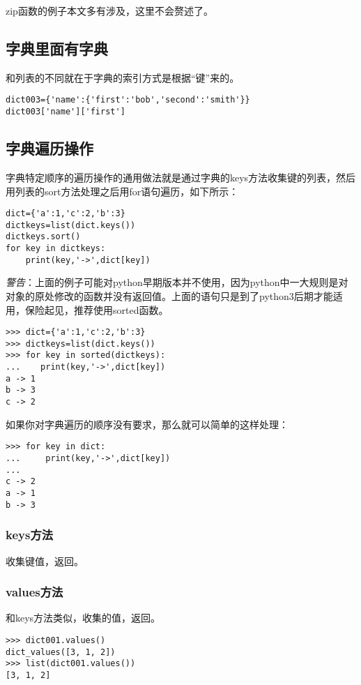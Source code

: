 \documentclass[12pt,oneside]{book}
\begin{document}
\begin{common-format}
zip函数的例子本文多有涉及，这里不会赘述了。



\subsection{字典里面有字典}
和列表的不同就在于字典的索引方式是根据“键”来的。
\begin{Verbatim}
dict003={'name':{'first':'bob','second':'smith'}}
dict003['name']['first']
\end{Verbatim}

\subsection{字典遍历操作}
字典特定顺序的遍历操作的通用做法就是通过字典的keys方法收集键的列表，然后用列表的sort方法处理之后用for语句遍历，如下所示：
\begin{Verbatim}
dict={'a':1,'c':2,'b':3}
dictkeys=list(dict.keys())
dictkeys.sort()
for key in dictkeys:
    print(key,'->',dict[key])
\end{Verbatim}

\emph{警告}：上面的例子可能对python早期版本并不使用，因为python中一大规则是对对象的原处修改的函数并没有返回值。上面的语句只是到了python3后期才能适用，保险起见，推荐使用sorted函数。
\begin{Verbatim}
>>> dict={'a':1,'c':2,'b':3}
>>> dictkeys=list(dict.keys())
>>> for key in sorted(dictkeys):
...    print(key,'->',dict[key])
a -> 1
b -> 3
c -> 2
\end{Verbatim}





如果你对字典遍历的顺序没有要求，那么就可以简单的这样处理：
\begin{Verbatim}
>>> for key in dict:
...     print(key,'->',dict[key])
... 
c -> 2
a -> 1
b -> 3
\end{Verbatim}

\subsubsection{keys方法}
收集键值，返回。

\subsubsection{values方法}
和keys方法类似，收集的值，返回。
\begin{Verbatim}
>>> dict001.values()
dict_values([3, 1, 2])
>>> list(dict001.values())
[3, 1, 2]
\end{Verbatim}


\end{common-format}
\end{document}

